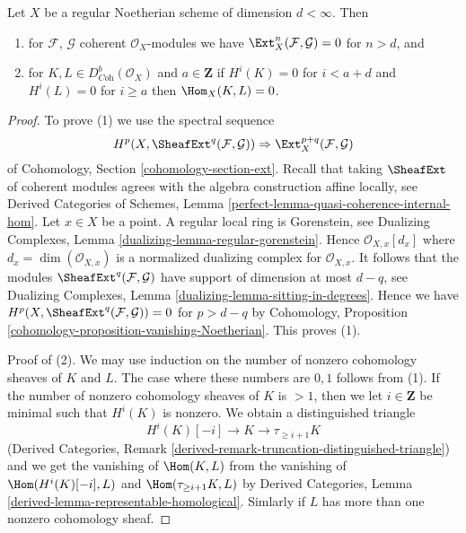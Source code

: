 \begin{lemma}
\label{lemma-Ext-0-regular}
Let $X$ be a regular Noetherian scheme of dimension $d < \infty$. Then
\begin{enumerate}
\item for $\mathcal{F}$, $\mathcal{G}$ coherent $\mathcal{O}_X$-modules
we have $\Ext^n_X(\mathcal{F}, \mathcal{G}) = 0$ for $n > d$, and
\item for $K, L \in D^b_{\textit{Coh}}(\mathcal{O}_X)$ and $a \in \mathbf{Z}$
if $H^i(K) = 0$ for $i < a + d$ and $H^i(L) = 0$ for $i \geq a$ then
$\Hom_X(K, L) = 0$.
\end{enumerate}
\end{lemma}

\begin{proof}
To prove (1) we use the spectral sequence
$$
H^p(X, \SheafExt^q(\mathcal{F}, \mathcal{G})) \Rightarrow
\Ext^{p + q}_X(\mathcal{F}, \mathcal{G})
$$
of Cohomology, Section \ref{cohomology-section-ext}. Recall that
taking $\SheafExt$ of coherent modules agrees with the algebra
construction affine locally, see
Derived Categories of Schemes, Lemma
\ref{perfect-lemma-quasi-coherence-internal-hom}.
Let $x \in X$ be a point. A regular local ring is Gorenstein, see
Dualizing Complexes, Lemma \ref{dualizing-lemma-regular-gorenstein}.
Hence $\mathcal{O}_{X, x}[d_x]$ where $d_x = \dim(\mathcal{O}_{X, x})$
is a normalized dualizing complex for $\mathcal{O}_{X, x}$. It follows that
the modules $\SheafExt^q(\mathcal{F}, \mathcal{G})$ have support
of dimension at most $d - q$, see
Dualizing Complexes, Lemma \ref{dualizing-lemma-sitting-in-degrees}.
Hence we have
$H^p(X, \SheafExt^q(\mathcal{F}, \mathcal{G})) = 0$ for $p > d - q$
by Cohomology, Proposition \ref{cohomology-proposition-vanishing-Noetherian}.
This proves (1).

\medskip\noindent
Proof of (2).
We may use induction on the number of nonzero cohomology sheaves
of $K$ and $L$. The case where these numbers are $0, 1$ follows
from (1). If the number of nonzero cohomology sheaves of $K$
is $> 1$, then we let $i \in \mathbf{Z}$ be minimal such that
$H^i(K)$ is nonzero. We obtain a distinguished triangle
$$
H^i(K)[-i] \to K \to \tau_{\geq i + 1}K
$$
(Derived Categories, Remark
\ref{derived-remark-truncation-distinguished-triangle})
and we get the vanishing of $\Hom(K, L)$ from the vanishing
of $\Hom(H^i(K)[-i], L)$ and $\Hom(\tau_{\geq i + 1}K, L)$
by Derived Categories, Lemma \ref{derived-lemma-representable-homological}.
Simlarly if $L$ has more than one nonzero cohomology sheaf.
\end{proof}

